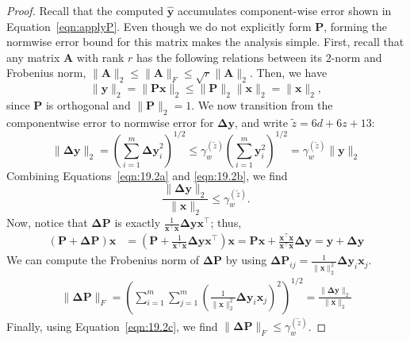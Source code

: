 \documentclass[review,onefignum,onetabnum]{siamart190516}
\newcommand{\bb}[1]{\mathbf{#1}}
\begin{document}
\begin{proof}
	Recall that the computed $\hat{\bb y}$ accumulates component-wise error shown in Equation~\ref{eqn:applyP}.
	Even though we do not explicitly form $\bb{P}$, forming the normwise error bound for this matrix makes the analysis simple.
	First, recall that any matrix $\bb{A}$ with rank $r$ has the following relations between its 2-norm and Frobenius norm,
	$\|\bb{A}\|_2\leq\|\bb{A}\|_F\leq\sqrt{r}\|\bb{A}\|_2$.
	Then, we have 
	\begin{equation}
	\label{eqn:19.2a}
	\|\bb{y}\|_2 = \|\bb{P x}\|_2 \leq \|\bb{P}\|_2 \|\bb{x}\|_2 = \|\bb{x}\|_2,
	\end{equation}
	since $\bb{P}$ is orthogonal and $\|\bb{P}\|_2=1$.
	We now transition from the componentwise error to normwise error for $\bb{\Delta y}$, and write $\tilde{z} = 6d+6z+13$:
	\begin{equation}
	\label{eqn:19.2b}
	\|\bb{\Delta y}\|_2 = \left(\sum_{i=1}^m \bb{\Delta y}_i^2\right)^{1/2} \leq \gamma_w^{(\tilde{z})}\left(\sum_{i=1}^m \bb{y}_i^2\right)^{1/2} =  \gamma_w^{(\tilde{z})}\|\bb{y}\|_2
	\end{equation}
	Combining Equations~\ref{eqn:19.2a} and \ref{eqn:19.2b}, we find
	\begin{equation}
	\frac{\|\bb{\Delta y}\|_2}{\|\bb{x}\|_2} \leq \gamma_w^{(\tilde{z})}. \label{eqn:19.2c}
	\end{equation}
	Now, notice that $\bb{\Delta P}$ is exactly $\frac{1}{\bb{x}^{\top}\bb{x}}\bb{\Delta y}\bb{x}^{\top}$; thus, 
	\begin{align*}
	(\bb{P}+\bb{\Delta P}) \bb{x} &= (\bb{P}+\frac{1}{\bb{x}^{\top}\bb{x}}\bb{\Delta y}\bb{x}^{\top})\bb{x}    %
	=\bb{P}\bb{x}  + \frac{\bb{x}^{\top}\bb{x}}{\bb{x}^{\top}\bb{x}}\bb{\Delta y} = \bb{y} + \bb{\Delta y}
	\end{align*}
	We can compute the Frobenius norm of $\bb{\Delta P}$ by using $\bb{\Delta P}_{ij} = \frac{1}{\|\bb{x}\|_2^2}\bb{\Delta y}_i\bb{x}_j$.
	\begin{align*}
	\|\bb{\Delta P}\|_F %
	= \left(\sum_{i=1}^m\sum_{j=1}^m\left(\frac{1}{\|\bb{x}\|_2^2}\bb{\Delta y}_i\bb{x}_j\right)^2\right)^{1/2} %
	=  \frac{\|\bb{\Delta y}\|_2}{\|\bb{x}\|_2}
	\end{align*}
	Finally, using Equation~\ref{eqn:19.2c}, we find $\|\bb{\Delta P}\|_F \leq \gamma_w^{(\tilde{z})}$.
\end{proof}
\end{document}
